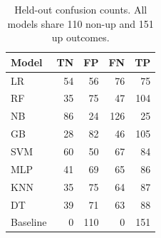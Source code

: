 \begin{table}[tb]
\centering\small
\caption{Held-out confusion counts. All models share 110 non-up and 151 up outcomes.}\label{tab:confusion}
\begin{tabular}{lrrrr}
\toprule
Model & TN & FP & FN & TP \\
\midrule
LR & 54 & 56 & 76 & 75 \\
RF & 35 & 75 & 47 & 104 \\
NB & 86 & 24 & 126 & 25 \\
GB & 28 & 82 & 46 & 105 \\
SVM & 60 & 50 & 67 & 84 \\
MLP & 41 & 69 & 65 & 86 \\
KNN & 35 & 75 & 64 & 87 \\
DT & 39 & 71 & 63 & 88 \\
Baseline & 0 & 110 & 0 & 151 \\
\bottomrule
\end{tabular}
\end{table}
